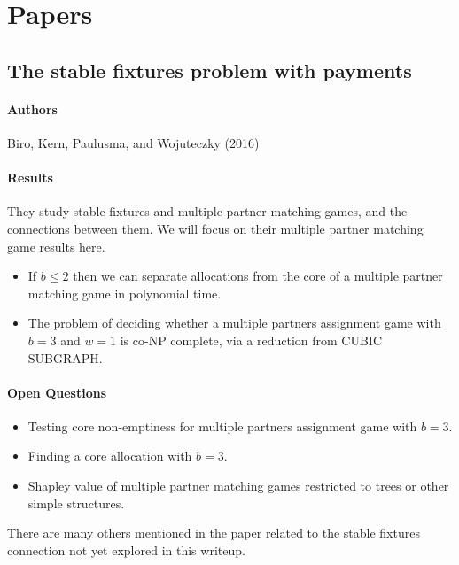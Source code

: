 \section{Papers}

\subsection{The stable fixtures problem with payments}
\paragraph{Authors} 
Biro, Kern, Paulusma, and Wojuteczky (2016) \cite{Biro2017}
\paragraph{Results}
They study stable fixtures and multiple partner matching games, and the connections between them. We will focus on their multiple partner matching game results here.
\begin{itemize}
\item If $b \leq 2$ then we can separate allocations from the core of a multiple partner matching game in polynomial time.
\item The problem of deciding whether a multiple partners assignment game with $b=3$ and $w=1$ is co-NP complete, via a reduction from CUBIC SUBGRAPH.
\end{itemize}
\paragraph{Open Questions}
\begin{itemize}
\item Testing core non-emptiness for multiple partners assignment game with $b=3$.
\item Finding a core allocation with $b=3$.
\item Shapley value of multiple partner matching games restricted to trees or other simple structures.
\end{itemize}
There are many others mentioned in the paper related to the stable fixtures connection not yet explored in this writeup.